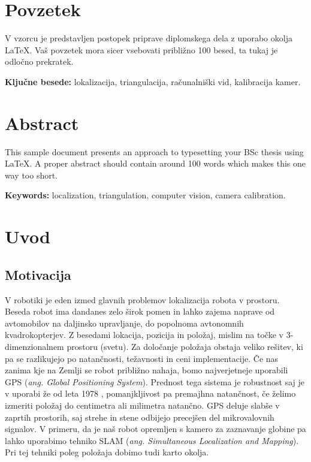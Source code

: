 \documentclass[a4paper, 12pt]{book}
\newcommand{\tkeywords}{lokalizacija, triangulacija, računalniški vid, kalibracija kamer}
\newcommand{\tkeywordsEn}{localization, triangulation, computer vision, camera calibration}
\newcommand{\clearemptydoublepage}{\newpage{\pagestyle{empty}\cleardoublepage}}
\begin{document}
\clearemptydoublepage

\chapter*{Povzetek}
V vzorcu je predstavljen postopek priprave diplomskega dela z uporabo okolja \LaTeX. Vaš povzetek mora sicer vsebovati približno 100 besed, ta tukaj je odločno prekratek.
\bigskip

\noindent\textbf{Ključne besede:} \tkeywords.
\clearemptydoublepage

\chapter*{Abstract}
This sample document presents an approach to typesetting your BSc thesis using \LaTeX. A proper abstract should contain around 100 words which makes this one way too short.
\bigskip

\noindent\textbf{Keywords:} \tkeywordsEn.
\clearemptydoublepage

\mainmatter
\setcounter{page}{1}
\pagestyle{fancy}

\chapter{Uvod}
\section{Motivacija}
V robotiki je eden izmed glavnih problemov lokalizacija robota v prostoru. Beseda robot ima dandanes zelo širok pomen in lahko zajema naprave od avtomobilov na daljinsko upravljanje, do popolnoma avtonomnih kvadrokopterjev. Z besedami lokacija, pozicija in položaj, mislim na točke v 3-dimenzionalnem prostoru (svetu). Za določanje položaja obstaja veliko rešitev, ki pa se razlikujejo po natančnosti, težavnosti in ceni implementacije. Če nas zanima kje na Zemlji se robot približno nahaja, bomo najverjetneje uporabili GPS (\emph{ang. Global Positioning System}). Prednost tega sistema je robustnost saj je v uporabi že od leta 1978 \cite{wiki:gps}, pomanjkljivost pa premajhna natančnost, če želimo izmeriti položaj do centimetra ali milimetra natančno. GPS deluje slabše v zaprtih prostorih, saj strehe in stene odbijejo precejšen del mikrovalovnih signalov. V primeru, da je naš robot opremljen s kamero za zaznavanje globine pa lahko uporabimo tehniko SLAM (\emph{ang. Simultaneous Localization and Mapping}). Pri tej tehniki poleg položaja dobimo tudi karto okolja.
\end{document}
